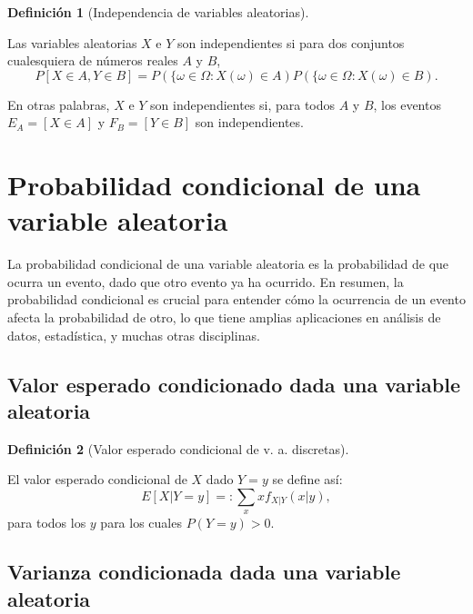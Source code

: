 \documentclass[
  us-letterpaper,
]{scrreprt}
\theoremstyle{plain}
\theoremstyle{plain}
\theoremstyle{definition}
\newtheorem{definition}{Definición}[chapter]
\theoremstyle{remark}
\begin{document}
\begin{definition}[Independencia de variables
aleatorias]\protect\hypertarget{def-ind_var_ale}{}\label{def-ind_var_ale}

Las variables aleatorias \(X\) e \(Y\) son independientes si para dos
conjuntos cualesquiera de números reales \(A\) y \(B\),
\[P[X \in A, Y \in B] = P(\{\omega \in \Omega: X(\omega) \in A)P(\{\omega \in \Omega: X(\omega) \in B).\]

En otras palabras, \(X\) e \(Y\) son independientes si, para todos \(A\)
y \(B\), los eventos \(E_A = [X \in A]\) y \(F_B = [Y \in B]\) son
independientes.

\end{definition}

\section{Probabilidad condicional de una variable
aleatoria}\label{probabilidad-condicional-de-una-variable-aleatoria}

La probabilidad condicional de una variable aleatoria es la probabilidad
de que ocurra un evento, dado que otro evento ya ha ocurrido. En
resumen, la probabilidad condicional es crucial para entender cómo la
ocurrencia de un evento afecta la probabilidad de otro, lo que tiene
amplias aplicaciones en análisis de datos, estadística, y muchas otras
disciplinas.

\subsection{Valor esperado condicionado dada una variable
aleatoria}\label{valor-esperado-condicionado-dada-una-variable-aleatoria}

\begin{definition}[Valor esperado condicional de v. a.
discretas]\protect\hypertarget{def-val_es_cond_v_a}{}\label{def-val_es_cond_v_a}

El valor esperado condicional de \(X\) dado \(Y = y\) se define así:
\[E[X | Y = y] =: \sum_x xf_{X|Y}(x | y),\] para todos los \(y\) para
los cuales \(P(Y = y) > 0\).

\end{definition}

\subsection{Varianza condicionada dada una variable
aleatoria}\label{varianza-condicionada-dada-una-variable-aleatoria}
\end{document}
